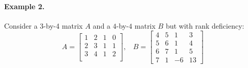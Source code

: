  





    \paragraph{Example 2.} Consider a 3-by-4 matrix $A$ and a $4$-by-$4$ matrix $B$ but with rank deficiency:
        \begin{equation*}
            A = \begin{bmatrix}
                1 & 2 & 1 & 0\\
                2 & 3 & 1 & 1\\
                3 & 4 & 1 & 2\\
            \end{bmatrix}, \ \ \ \
            B = \begin{bmatrix}
                4 & 5 & 1 & 3 \\
                5 & 6 & 1 & 4 \\
                6 & 7 & 1 & 5 \\
                7 & 1 & -6 & 13
            \end{bmatrix}
        \end{equation*}
    
